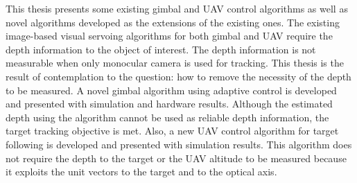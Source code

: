 \afterpage{\cleardoublepage}
This thesis presents some existing gimbal and UAV control algorithms as well as novel algorithms developed as the extensions of the existing ones. The existing image-based visual servoing algorithms for both gimbal and UAV require the depth information to the object of interest. The depth information is not measurable when only monocular camera is used for tracking. This thesis is the result of contemplation to the question: how to remove the necessity of the depth to be measured. 
A novel gimbal algorithm using adaptive control is developed and presented with simulation and hardware results. Although the estimated depth using the algorithm cannot be used as reliable depth information, the target tracking objective is met.
Also, a new UAV control algorithm for target following is developed and presented with simulation results. This algorithm does not require the depth to the target or the UAV altitude to be measured because it exploits the unit vectors to the target and to the optical axis. 